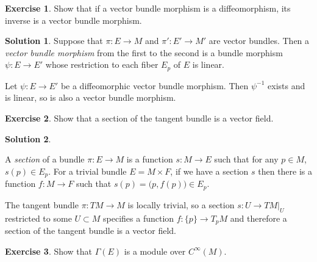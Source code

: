 \documentclass[11pt, a4paper]{report}
\theoremstyle{definition}
\newtheorem{exercise}{Exercise}[part]
\newtheorem{solution}{Solution}[part]
\newenvironment{ex}{\begin{exercise}}{\end{exercise}\pagebreak[1]}
\newenvironment{sol}{\begin{solution}}{\end{solution}\pagebreak[3]}
\begin{document}
\begin{ex}

Show that if a vector bundle morphism is a diffeomorphism, its inverse is a vector bundle morphism.

\end{ex}

\begin{sol}

Suppose that $\pi: E \to M$ and $\pi': E' \to M'$ are vector bundles.
Then a \emph{vector bundle morphism} from the first to the second is a bundle morphism $\psi: E \to E'$ whose restriction to each fiber $E_p$ of $E$ is linear.

Let $\psi: E \to E'$ be a diffeomorphic vector bundle morphism. Then $\psi^{-1}$ exists and is linear, so is also a vector bundle morphism.

\end{sol}

\begin{ex}

Show that a section of the tangent bundle is a vector field.

\end{ex}

\begin{sol}\label{sol:sectionoftangentbundle}

A \emph{section} of a bundle $\pi: E \to M$ is a function $s: M \to E$ such that for any $p \in M$, $s(p) \in E_p$.
For a trivial bundle $E = M \times F$, if we have a section $s$ then there is a function $f: M \to F$ such that $s(p) = \bigl(p, f(p) \bigr) \in E_p$.

The tangent bundle $\pi: TM \to M$ is locally trivial, so a section $s: U \to TM|_U$ restricted to some $U \subset M$ specifies a function $f: \{p\} \to T_p M$ and therefore a section of the tangent bundle is a vector field.

\end{sol}

\begin{ex}

Show that $\Gamma(E)$ is a module over $C^\infty(M)$.

\end{ex}
\end{document}
